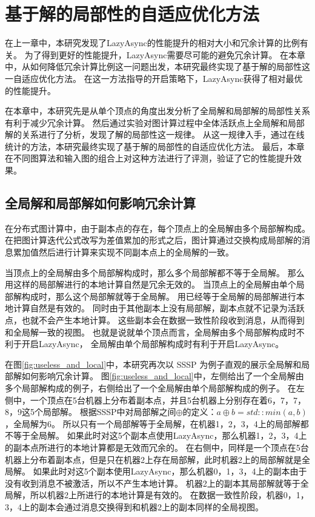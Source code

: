 \chapter{基于解的局部性的自适应优化方法}
在上一章中，本研究发现了LazyAsync的性能提升的相对大小和冗余计算的比例有关。
为了得到更好的性能提升，LazyAsync需要尽可能的避免冗余计算。
在本章中，从如何降低冗余计算比例这一问题出发，本研究最终实现了基于解的局部性这一自适应优化方法。
在这一方法指导的开启策略下，LazyAsync获得了相对最优的性能提升。

在本章中，本研究先是从单个顶点的角度出发分析了全局解和局部解的局部性关系有利于减少冗余计算。
然后通过实验对图计算过程中全体活跃点上全局解和局部解的关系进行了分析，发现了解的局部性这一规律。
从这一规律入手，通过在线统计的方法，本研究最终实现了基于解的局部性的自适应优化方法。
最后，本章在不同图算法和输入图的组合上对这种方法进行了评测，验证了它的性能提升效果。

\section{全局解和局部解如何影响冗余计算}

在分布式图计算中，由于副本点的存在，每个顶点上的全局解由多个局部解构成。
在把图计算迭代公式改写为差值累加的形式之后，图计算通过交换构成局部解的消息累加值然后进行计算来实现不同副本点上的全局解的一致。

当顶点上的全局解由多个局部解构成时，那么多个局部解都不等于全局解。
那么用这样的局部解进行的本地计算自然是冗余无效的。
当顶点上的全局解由单个局部解构成时，那么这个局部解就等于全局解。
用已经等于全局解的局部解进行本地计算自然是有效的。
同时由于其他副本上没有局部解，副本点就不记录为活跃点，也就不会产生本地计算。
这些副本会在数据一致性阶段收到消息，从而得到和全局解一致的视图。
也就是说就单个顶点而言，全局解由多个局部解构成时不利于开启LazyAsync，
全局解由单个局部解构成时有利于开启LazyAsync。


在图\ref{fig:useless_and_local}中，本研究再次以 SSSP 为例子直观的展示全局解和局部解如何影响冗余计算。
图\ref{fig:useless_and_local}中，左侧给出了一个全局解由多个局部解构成的例子，右侧给出了一个全局解由单个局部解构成的例子。
在左侧中，一个顶点在5台机器上分布着副本点，并且5台机器上分别存在着6，7，7，8，9这5个局部解。
根据SSSP中对局部解之间$\oplus$的定义：$a\oplus b=std::min(a,b)$，全局解为6。
所以只有一个局部解等于全局解，在机器1，2，3，4上的局部解都不等于全局解。
如果此时对这5个副本点使用LazyAsync，那么机器1，2，3，4上的副本点所进行的本地计算都是无效而冗余的。
在右侧中，同样是一个顶点在5台机器上分布着副本点，但是只在机器2上存在局部解，此时机器2上的局部解就是全局解。
如果此时对这5个副本使用LazyAsync，那么机器0，1，3，4上的副本由于没有收到消息不被激活，所以不产生本地计算。
机器2上的副本其局部解就等于全局解，所以机器2上所进行的本地计算是有效的。
在数据一致性阶段，机器0，1，3，4上的副本会通过消息交换得到和机器2上的副本同样的全局视图。



